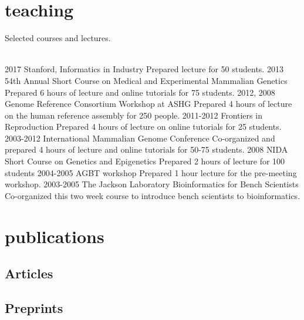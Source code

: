\documentclass[]{dmc-cv} %
\begin{document}
\section{teaching}
Selected courses and lectures.\\
\\
\begin{entrylist}
\entry
{2017}
{Stanford, Informatics in Industry}
{}
{Prepared lecture for 50 students.}
\entry
{2013}
{54th Annual Short Course on Medical and Experimental Mammalian Genetics}
{ }
{Prepared 6 hours of lecture and online tutorials for 75 students.}
\entry
{2012, 2008}
{Genome Reference Consortium Workshop at ASHG}
{ }
{Prepared 4 hours of lecture on the human reference assembly for 250 people.}
\entry
{2011-2012}
{Frontiers in Reproduction}
{ }
{Prepared 4 hours of lecture on online tutorials for 25 students.}
\entry
{2003-2012}
{International Mammalian Genome Conference}
{ }
{Co-organized and prepared 4 hours of lecture and online tutorials for 50-75 students.}
\entry
{2008}
{NIDA Short Course on Genetics and Epigenetics}
{ }
{Prepared 2 hours of lecture for 100 students }
\entry
{2004-2005}
{AGBT workshop}
{ }
{Prepared 1 hour lecture for the pre-meeting workshop.}
\entry
{2003-2005}
{The Jackson Laboratory Bioinformatics for Bench Scientists}
{ }
{Co-organized this two week course to introduce bench scientists to bioinformatics.}
\end{entrylist}


\section{publications}
\subsection{Articles}
\printbibliography[type=article, heading=none]
\nocite{*}

\subsection{Preprints}
\printbibliography[type=unpublished, heading=none]
\nocite{*}
\end{document}
